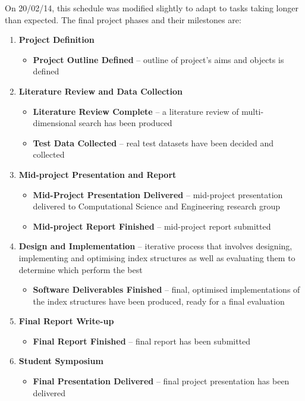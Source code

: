 On 20/02/14, this schedule was modified slightly to adapt to tasks taking longer than expected. The final project phases and their milestones are:
\begin{enumerate}
	\item \textbf{Project Definition}
	\begin{itemize}
		\item \textbf{Project Outline Defined} -- outline of project's aims and objects is defined 
	\end{itemize}
	\item \textbf{Literature Review and Data Collection}
	\begin{itemize}	
		\item \textbf{Literature Review Complete} -- a literature review of multi-dimensional search has been produced
		\item \textbf{Test Data Collected} -- real test datasets have been decided and collected
	\end{itemize}
	\item \textbf{Mid-project Presentation and Report}
	\begin{itemize}	
		\item \textbf{Mid-Project Presentation Delivered} -- mid-project presentation delivered to Computational Science and Engineering research group
		\item \textbf{Mid-project Report Finished} --  mid-project report submitted
	\end{itemize}	

	\vspace{60pt}

	\item \textbf{Design and Implementation} -- iterative process that involves designing, implementing and optimising index structures as well as evaluating them to determine which perform the best
	\begin{itemize}
		\item \textbf{Software Deliverables Finished} -- final, optimised implementations of the index structures have been produced, ready for a final evaluation
	\end{itemize}
	\item \textbf{Final Report Write-up}
	\begin{itemize}
		\item \textbf{Final Report Finished} -- final report has been submitted
	\end{itemize}
	\item \textbf{Student Symposium}
	\begin{itemize}
		\item \textbf{Final Presentation Delivered} -- final project presentation has been delivered 
	\end{itemize}
\end{enumerate}

